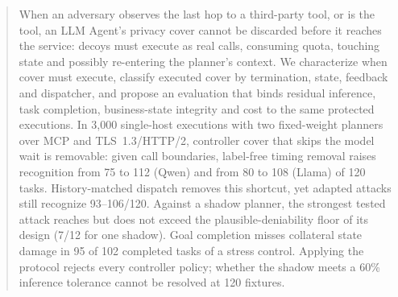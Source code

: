\begin{abstract}
When an adversary observes the last hop to a third-party tool, or is the tool, an LLM Agent's privacy cover cannot be discarded before it reaches the service: decoys must execute as real calls, consuming quota, touching state and possibly re-entering the planner's context. We characterize when cover must execute, classify executed cover by termination, state, feedback and dispatcher, and propose an evaluation that binds residual inference, task completion, business-state integrity and cost to the same protected executions. In 3,000 single-host executions with two fixed-weight planners over MCP and TLS~1.3/HTTP/2, controller cover that skips the model wait is removable: given call boundaries, label-free timing removal raises recognition from 75 to 112 (Qwen) and from 80 to 108 (Llama) of 120 tasks. History-matched dispatch removes this shortcut, yet adapted attacks still recognize 93--106/120. Against a shadow planner, the strongest tested attack reaches but does not exceed the plausible-deniability floor of its design (7/12 for one shadow). Goal completion misses collateral state damage in 95 of 102 completed tasks of a stress control. Applying the protocol rejects every controller policy; whether the shadow meets a 60\% inference tolerance cannot be resolved at 120 fixtures.
\end{abstract}
